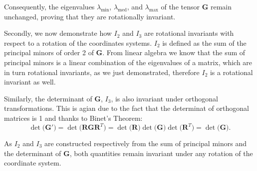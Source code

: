 \noindent 
Consequently, the eigenvalues \( \lambda_{\text{min}} \), \( \lambda_{\text{med}} \), 
and \( \lambda_{\text{max}} \) of the tensor \( \mathbf{G} \) remain unchanged, 
proving that they are rotationally invariant.

\noindent
Secondly, we now demonstrate how \( I_2 \) and \( I_3 \) are rotational invariants 
with respect to a rotation of the coordinates systems.
\( I_2 \) is defined as the sum of the principal minors of order 2 of \( \mathbf{G} \). 
From linear algebra we know that the sum of principal minors is a linear combination of the eigenvalues
of a matrix, which are in turn rotational invariants, as we just demonstrated, therefore \( I_2 \)
is a rotational invariant as well.

\noindent
Similarly, the determinant of \( \mathbf{G} \), \( I_3 \),
is also invariant under orthogonal transformations. 
This is agian due to the fact that the determinat of orthogonal matrices is 1 and thanks
to Binet's Theorem:
\[
    \det\big(\mathbf{G}'\big) = \det\big(\mathbf{R} \mathbf{G} \mathbf{R}^T\big) = 
    \det\big(\mathbf{R}\big) \det\big(\mathbf{G}\big) \det\big(\mathbf{R}^T\big) = 
    \det\big(\mathbf{G}\big). 
\]

\noindent
As \( I_2 \) and \( I_3 \) are constructed respectively from the sum of principal minors 
and the determinant of \( \mathbf{G} \), both quantities remain invariant under any rotation 
of the coordinate system.















